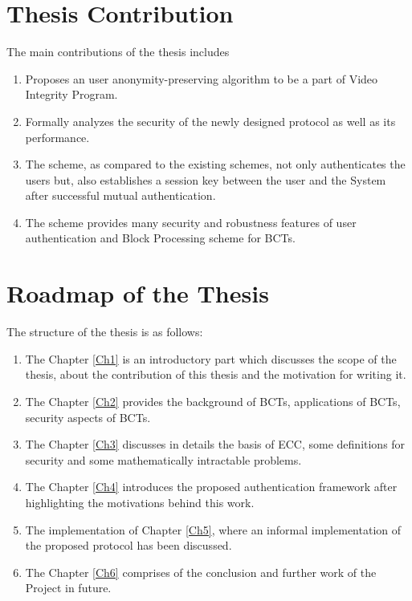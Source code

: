 \documentclass[a4paper,12pt]{report}
\begin{document}
\section{Thesis Contribution}
The main contributions of the thesis includes
\begin{enumerate}
\item Proposes an user anonymity-preserving algorithm to be a part of Video Integrity Program.
\item Formally analyzes the security of the newly designed protocol as well as its performance.
\item The scheme, as compared to the existing schemes, not only authenticates the users but, also establishes a session key between the user and the System after successful mutual authentication.
\item The scheme provides many security and robustness features of user authentication and Block Processing scheme for BCTs.
\end{enumerate}

\section{Roadmap of the Thesis}
The structure of the thesis is as follows:
\begin{enumerate}
\item The Chapter \ref{Ch1} is an introductory part which discusses the scope of the thesis, about the contribution of this thesis and the motivation for writing it.
\item The Chapter \ref{Ch2} provides the background of BCTs, applications of BCTs, security aspects of BCTs.
\item The Chapter \ref{Ch3} discusses in details the basis of ECC, some definitions for security and some mathematically intractable problems.
\item The Chapter \ref{Ch4} introduces the proposed authentication framework after highlighting the motivations behind this work.
\item The implementation of Chapter \ref{Ch5}, where an informal implementation of the proposed protocol has been discussed.
\item The Chapter \ref{Ch6} comprises of the conclusion and further work of the Project in future.
\end{enumerate}

\afterpage{\null\newpage}

\end{document}
